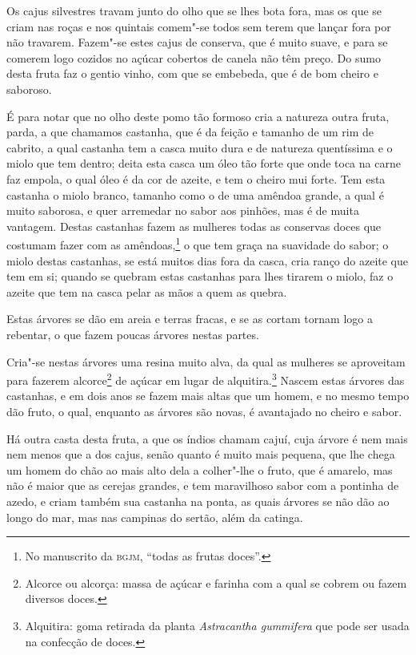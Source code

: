 \begin{linenumbers}
Os cajus silvestres travam junto do olho que se lhes bota fora, mas os que se criam nas
roças e nos quintais comem"-se todos sem terem que lançar fora por não travarem. Fazem"-se
estes cajus de conserva, que é muito suave, e para se comerem logo cozidos no açúcar
cobertos de canela não têm preço. Do sumo desta fruta faz o gentio vinho, com que se
embebeda, que é de bom cheiro e saboroso.

É para notar que no olho deste pomo tão formoso cria a natureza outra fruta, parda, a que
chamamos castanha, que é da feição e tamanho de um rim de cabrito, a qual castanha tem a
casca muito dura e de natureza quentíssima e o miolo que tem dentro; deita esta casca um
óleo tão forte que onde toca na carne faz empola, o qual óleo é da cor de azeite, e tem o
cheiro mui forte. Tem esta castanha o miolo branco, tamanho como o de uma amêndoa grande,
a qual é muito saborosa, e quer arremedar no sabor aos pinhões, mas é de muita vantagem.
Destas castanhas fazem as mulheres todas as conservas doces que costumam fazer com as
amêndoas,\footnote{ No manuscrito da \textsc{bgjm}, ``todas as frutas doces''.} o que tem
graça na suavidade do sabor; o miolo destas castanhas, se está muitos dias fora da casca,
cria ranço do azeite que tem em si; quando se quebram estas castanhas para lhes tirarem o
miolo, faz o azeite que tem na casca pelar as mãos a quem as quebra.

Estas árvores se dão em areia e terras fracas, e se as cortam tornam logo a rebentar, o
que fazem poucas árvores nestas partes.

Cria"-se nestas árvores uma resina muito alva, da qual as mulheres se aproveitam para
fazerem alcorce\footnote{ Alcorce ou alcorça: massa de açúcar e farinha com a qual se
cobrem ou fazem diversos doces.} de açúcar em lugar de alquitira.\footnote{ Alquitira:
goma retirada da planta \textit{Astracantha gummifera} que pode ser usada na confecção de
doces.} Nascem estas árvores das castanhas, e em dois anos se fazem mais altas que um
homem, e no mesmo tempo dão fruto, o qual, enquanto as árvores são novas, é avantajado no
cheiro e sabor.

Há outra casta desta fruta, a que os índios chamam cajuí, cuja árvore é nem mais nem menos
que a dos cajus, senão quanto é muito mais pequena, que lhe chega um homem do chão ao mais
alto dela a colher"-lhe o fruto, que é amarelo, mas não é maior que as cerejas grandes, e
tem maravilhoso sabor com a pontinha de azedo, e criam também sua castanha na ponta, as
quais árvores se não dão ao longo do mar, mas nas campinas do sertão, além da catinga.


\end{linenumbers}
